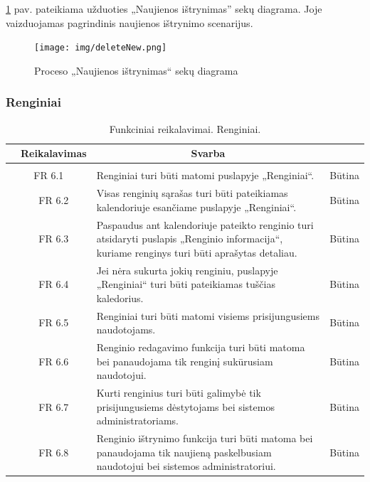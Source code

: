 \documentclass{VUMIFPSkursinis}
\begin{document}
\ref{fig:delnews} pav. pateikiama užduoties „Naujienos ištrynimas” sekų diagrama. Joje vaizduojamas pagrindinis
naujienos ištrynimo scenarijus.
\begin{figure}[H]
	\centering
	\texttt{[image: img/deleteNew.png]}
	\caption{Proceso „Naujienos ištrynimas“ sekų diagrama}
	\label{fig:delnews}
\end{figure}

\subsubsection{Renginiai}

\begin{table}[H]
	\caption{Funkciniai reikalavimai. Renginiai.}
	\begin{tabular}{|p{1cm}|p{1cm}|p{}|p{}|}
		\hline 
		\rowcolor{gray!50}
		\multicolumn{2}{|c|}{{\bfseries Kodas}}&
		\multicolumn{1}{c|}{{\bfseries Reikalavimas}}&
		\multicolumn{1}{c|}{{\bfseries Svarba}}\\
		\hline
		\rowcolor{lightgray}
		\multicolumn{4}{|c|}{Renginiai}\\		
		
		\hline
		\multicolumn{2}{|c|}{FR 6.1}&
		{Renginiai turi būti matomi puslapyje „Renginiai“.
		}&		
		\multicolumn{1}{c|}{Būtina}\\
		\hline
		\multicolumn{1}{|c}{}&
		\multicolumn{1}{c|}{FR 6.2}&
		{Visas renginių sąrašas turi būti pateikiamas kalendoriuje esančiame puslapyje „Renginiai“.
		}&		
		\multicolumn{1}{c|}{Būtina}\\
		\hline
		\multicolumn{1}{|c}{}&
		\multicolumn{1}{c|}{FR 6.3}&
		{Paspaudus ant kalendoriuje pateikto renginio turi atsidaryti puslapis „Renginio informacija“, kuriame renginys turi būti aprašytas detaliau.
		}&
		\multicolumn{1}{c|}{Būtina}\\	
		\hline		
		\multicolumn{1}{|c}{}&
		\multicolumn{1}{c|}{FR 6.4}&
		{Jei nėra sukurta jokių renginiu, puslapyje „Renginiai“ turi būti pateikiamas tuščias kaledorius.
		}&
		\multicolumn{1}{c|}{Būtina}\\									
		\hline
		\multicolumn{1}{|c}{}&
		\multicolumn{1}{c|}{FR 6.5}&
		{Renginiai turi būti matomi visiems prisijungusiems naudotojams.
		}&
		\multicolumn{1}{c|}{Būtina}\\	
		\hline		
		\multicolumn{1}{|c}{}&
		\multicolumn{1}{c|}{FR 6.6}&
		{Renginio redagavimo funkcija turi būti matoma bei panaudojama tik renginį sukūrusiam naudotojui.
		}&
		\multicolumn{1}{c|}{Būtina}\\									
		\hline
		\multicolumn{1}{|c}{}&
		\multicolumn{1}{c|}{FR 6.7}&
		{Kurti renginius turi būti galimybė tik prisijungusiems dėstytojams bei sistemos administratoriams.
		}&
		\multicolumn{1}{c|}{Būtina}\\	
		\hline		
		\multicolumn{1}{|c}{}&
		\multicolumn{1}{c|}{FR 6.8}&
		{Renginio ištrynimo funkcija turi būti matoma bei panaudojama tik naujieną paskelbusiam naudotojui bei sistemos administratoriui.
		}&
		\multicolumn{1}{c|}{Būtina}\\									
		\hline
	\end{tabular}		
\end{table}
\end{document}
